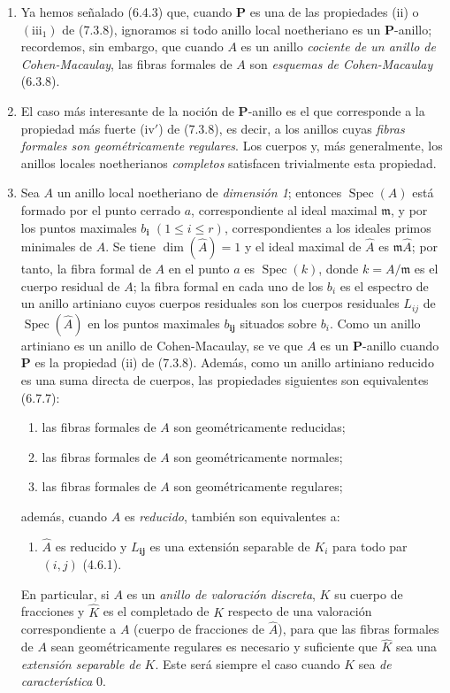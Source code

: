 \begin{remarks}[7.3.19]
\begin{enumerate}
\item[\textup{(ii)}] Ya hemos señalado (6.4.3) que, cuando
$\boldsymbol P$ es una de las propiedades (ii) o
$(\mathrm{iii}_1)$ de (7.3.8), ignoramos si todo anillo local
noetheriano es un $\boldsymbol P$-anillo; recordemos, sin embargo,
que cuando $A$ es un anillo \emph{cociente de un anillo de
Cohen-Macaulay}, las fibras formales de $A$ son \emph{esquemas de
Cohen-Macaulay} (6.3.8).
\item[\textup{(iii)}] El caso más interesante de la noción de
$\boldsymbol P$-anillo es el que corresponde a la propiedad más
fuerte (iv$'$) de (7.3.8), es decir, a los anillos cuyas
\emph{fibras formales son geométricamente regulares}. Los cuerpos y,
más generalmente, los anillos locales noetherianos \emph{completos}
satisfacen trivialmente esta propiedad.
\item[\textup{(iv)}] Sea $A$ un anillo local noetheriano de
\emph{dimensión 1}; entonces $\operatorname{Spec}(A)$ está formado
por el punto cerrado $a$, correspondiente al ideal maximal
$\mathfrak m$, y por los puntos maximales $b_{\boldsymbol{i}}$
$(1\leqslant i\leqslant r)$, correspondientes a los ideales primos
minimales de $A$. Se tiene $\dim(\widehat A)=1$ y el ideal maximal
de $\widehat A$ es $\mathfrak m\widehat A$; por tanto, la fibra
formal de $A$ en el punto $a$ es $\operatorname{Spec}(k)$, donde
$k=A/\mathfrak m$ es el cuerpo residual de $A$; la fibra formal
en cada uno de los $b_i$ es el espectro de un anillo artiniano
cuyos cuerpos residuales son los cuerpos residuales $L_{ij}$ de
$\operatorname{Spec}(\widehat A)$ en los puntos maximales $b_{\boldsymbol{ij}}$
situados sobre $b_i$. Como un anillo artiniano es un anillo de
Cohen-Macaulay, se ve que $A$ es un $\boldsymbol P$-anillo cuando
$\boldsymbol P$ es la propiedad (ii) de (7.3.8). Además, como un
anillo artiniano reducido es una suma directa de cuerpos, las
propiedades siguientes son equivalentes (6.7.7):
\begin{enumerate}
\item[\emph{a)}] las fibras formales de $A$ son geométricamente
reducidas;
\item[\emph{b)}] las fibras formales de $A$ son geométricamente
normales;
\item[\emph{c)}] las fibras formales de $A$ son geométricamente
regulares;
\end{enumerate}
además, cuando $A$ es \emph{reducido}, también son equivalentes a:
\begin{enumerate}
\item[\emph{d)}] $\widehat A$ es reducido y $L_{\boldsymbol{ij}}$ es una
extensión separable de $K_i$ para todo par $(i,j)$ (4.6.1).
\end{enumerate}
En particular, si $A$ es un \emph{anillo de valoración discreta},
$K$ su cuerpo de fracciones y $\widehat K$ es el completado de $K$
respecto de una valoración correspondiente a $A$ (cuerpo de
fracciones de $\widehat A$), para que las fibras formales de $A$
sean geométricamente regulares es necesario y suficiente que
$\widehat K$ sea una \emph{extensión separable de} $K$. Este será
siempre el caso cuando $K$ sea \emph{de característica} 0.
\end{enumerate}
\end{remarks}

